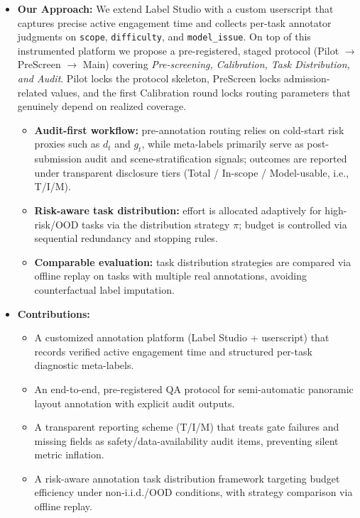 \begin{itemize}
  \item \textbf{Our Approach:}
  We extend Label Studio with a custom userscript that captures precise active engagement time and
  collects per-task annotator judgments on \texttt{scope}, \texttt{difficulty}, and \texttt{model\_issue}.
  On top of this instrumented platform we propose a pre-registered, staged protocol
  (Pilot $\rightarrow$ PreScreen $\rightarrow$ Main) covering \emph{Pre-screening, Calibration, Task Distribution, and Audit}. Pilot locks the protocol skeleton, PreScreen locks admission-related values, and the first Calibration round locks routing parameters that genuinely depend on realized coverage.
  \begin{itemize}
    \item \textbf{Audit-first workflow:} pre-annotation routing relies on cold-start risk proxies such as $d_t$ and $g_t$, while meta-labels primarily serve as post-submission audit and scene-stratification signals; outcomes are reported under transparent disclosure tiers (Total / In-scope / Model-usable, i.e., T/I/M).
    \item \textbf{Risk-aware task distribution:} effort is allocated adaptively for high-risk/OOD tasks via the distribution strategy $\pi$; budget is controlled via sequential redundancy and stopping rules.
    \item \textbf{Comparable evaluation:} task distribution strategies are compared via offline replay on tasks with multiple real annotations, avoiding counterfactual label imputation.
  \end{itemize}

  \item \textbf{Contributions:}
  \begin{itemize}
    \item A customized annotation platform (Label Studio + userscript) that records verified active engagement time and structured per-task diagnostic meta-labels.
    \item An end-to-end, pre-registered QA protocol for semi-automatic panoramic layout annotation with explicit audit outputs.
    \item A transparent reporting scheme (T/I/M) that treats gate failures and missing fields as safety/data-availability audit items, preventing silent metric inflation.
    \item A risk-aware annotation task distribution framework targeting budget efficiency under non-i.i.d./OOD conditions, with strategy comparison via offline replay.
  \end{itemize}

\end{itemize}
